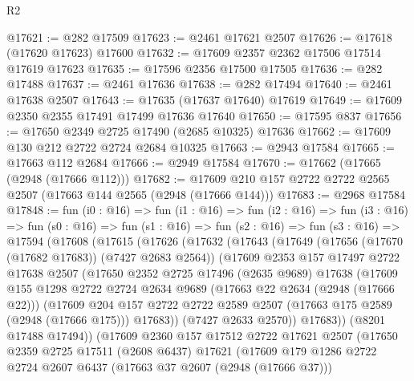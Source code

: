 \begin{lexlean}{R2}
\begin{coremodule}
@17621 := @282 @17509
@17623 := @2461 @17621 @2507
@17626 := @17618 (@17620 @17623) @17600
@17632 := @17609 @2357 @2362 @17506 @17514 @17619 @17623
@17635 := @17596 @2356 @17500 @17505
@17636 := @282 @17488
@17637 := @2461 @17636
@17638 := @282 @17494
@17640 := @2461 @17638 @2507
@17643 := @17635 (@17637 @17640) @17619
@17649 := @17609 @2350 @2355 @17491 @17499 @17636 @17640
@17650 := @17595 @837
@17656 := @17650 @2349 @2725 @17490 (@2685 @10325) @17636
@17662 := @17609 @130 @212 @2722 @2724 @2684 @10325
@17663 := @2943 @17584
@17665 := @17663 @112 @2684
@17666 := @2949 @17584
@17670 := @17662 (@17665 (@2948 (@17666 @112)))
@17682 := @17609 @210 @157 @2722 @2722 @2565 @2507 (@17663 @144 @2565 (@2948 (@17666 @144)))
@17683 := @2968 @17584
@17848 := fun (i0 : @16) =>
  fun (i1 : @16) =>
  fun (i2 : @16) =>
  fun (i3 : @16) =>
  fun (s0 : @16) =>
  fun (s1 : @16) =>
  fun (s2 : @16) =>
  fun (s3 : @16) =>
  @17594
    (@17608
      (@17615
        (@17626
          (@17632
            (@17643
              (@17649
                (@17656 (@17670 (@17682 @17683)) (@7427 @2683 @2564))
                (@17609
                  @2353
                  @157
                  @17497
                  @2722
                  @17638
                  @2507
                  (@17650
                    @2352
                    @2725
                    @17496
                    (@2635 @9689)
                    @17638
                    (@17609
                      @155
                      @1298
                      @2722
                      @2724
                      @2634
                      @9689
                      (@17663 @22 @2634 (@2948 (@17666 @22)))
                      (@17609
                        @204
                        @157
                        @2722
                        @2722
                        @2589
                        @2507
                        (@17663 @175 @2589 (@2948 (@17666 @175)))
                        @17683))
                    (@7427 @2633 @2570))
                  @17683))
              (@8201 @17488 @17494))
            (@17609
              @2360
              @157
              @17512
              @2722
              @17621
              @2507
              (@17650
                @2359
                @2725
                @17511
                (@2608 @6437)
                @17621
                (@17609
                  @179
                  @1286
                  @2722
                  @2724
                  @2607
                  @6437
                  (@17663 @37 @2607 (@2948 (@17666 @37)))

\end{coremodule}
\end{lexlean}
